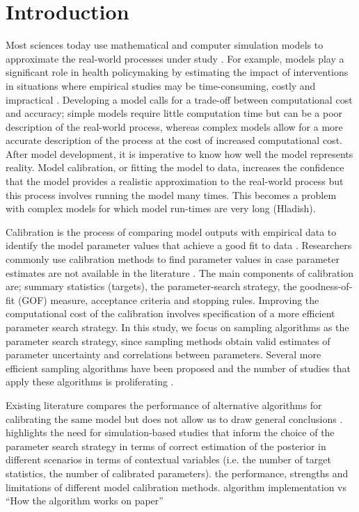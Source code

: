 \chapter{Introduction}
\label{chp:Intro}
Most sciences today use mathematical and computer simulation models to approximate the real-world processes under study \cite{Kennedy,Fojo,Vanni}. For example, models play a significant role in health policymaking by estimating the impact of interventions in situations where empirical studies may be time-consuming, costly and impractical \cite{Stout}. Developing a model calls for a trade-off between computational cost and accuracy; simple models require little computation time but can be a poor description of the real-world process, whereas complex models allow for a more accurate description of the process at the cost of increased computational cost. After model development, it is imperative to know how well the model represents reality. Model calibration, or fitting the model to data, increases the confidence that the model provides a realistic approximation to the real-world process \cite{Vanni,Stout} but this process involves running the model many times. This becomes a problem with complex models for which model run-times are very long (Hladish).     
    
 Calibration is the process of comparing model outputs with empirical data to identify the model parameter values that achieve a good fit to data \cite{Menzies,Vanni}. Researchers commonly use calibration methods to find parameter values in case parameter estimates are not available in the literature  \cite{Elske}. The main components of calibration are; summary statistics (targets), the parameter-search strategy, the goodness-of-fit (GOF) measure, acceptance criteria and stopping rules.  Improving the computational cost of the calibration involves specification of a more efficient parameter search strategy. In this study, we focus on sampling algorithms as the parameter search strategy, since sampling methods obtain valid estimates of parameter uncertainty and correlations between parameters. Several more efficient sampling algorithms have been proposed and the number of studies that apply these algorithms is proliferating  \cite{Vanni}. 
 
Existing literature compares the performance of alternative algorithms for calibrating the same model but does not allow us to draw general conclusions \cite{Dahabreh, Minter}. \cite{Hazelbag} highlights the need for simulation-based studies that inform the choice of the parameter search strategy in terms of correct estimation of the posterior in different scenarios in terms of contextual variables (i.e. the number of target statistics, the number of calibrated parameters).  the performance, strengths and limitations of different model calibration methods. algorithm implementation vs “How the algorithm works on paper”


